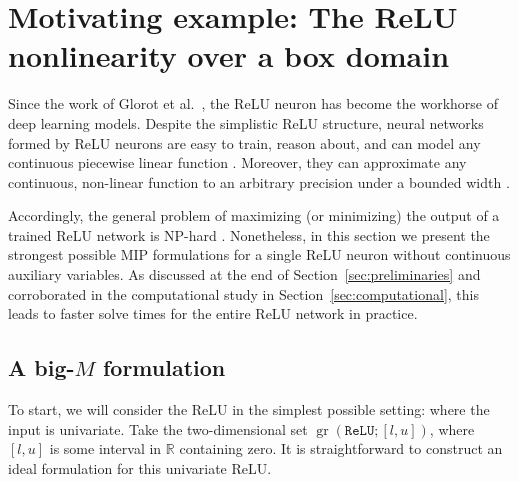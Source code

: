\documentclass[smallextended]{svjour3}
\newcommand{\blue}[1]{{#1}}
\newcommand{\bbR}{\mathbb{R}}
\newcommand{\gr}{\operatorname{gr}}
\newcommand{\TODO}[1]{\textbf{\color{red} TODO: }{\emph{#1}}}
\newcommand{\ReLu}{\texttt{ReLU}}
\begin{document}

\section{Motivating example: The ReLU nonlinearity over a box domain} \label{sec:relu}

\blue{
Since the work of Glorot et al.~\cite{glorot2011deep}, the ReLU neuron has become the workhorse of deep learning models. Despite the simplistic ReLU structure, neural networks formed by ReLU neurons are easy to train, reason about, and can model any continuous piecewise linear function \cite{arora2016understanding}.
Moreover, they can approximate any continuous, non-linear function to an arbitrary precision under a bounded width \cite{hanin2017universal}.

Accordingly, the general problem of maximizing (or minimizing) the output of a trained ReLU network is NP-hard \cite{Katz:2017}.
Nonetheless, in this section we present the strongest possible MIP formulations for a single ReLU neuron without continuous auxiliary variables. As discussed at the end of Section~\ref{sec:preliminaries} and corroborated in the computational study in Section~\ref{sec:computational}, this leads to faster solve times for the entire ReLU network in practice.
}

\subsection{A big-$M$ formulation} \label{ssec:relu-standard-formulations}

To start, we will consider the ReLU in the simplest possible setting: where the input is univariate. Take the two-dimensional set $\gr(\ReLu{}; [l,u])$, where $[l,u]$ is some interval in $\bbR$ containing zero. It is straightforward to construct an ideal formulation for this univariate ReLU.
\end{document}
